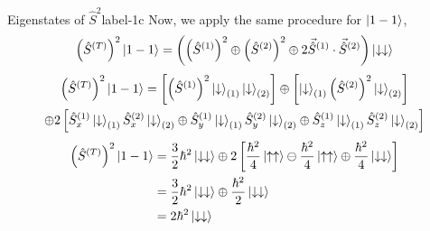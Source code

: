 \documentclass[../main.tex]{subfiles}
\begin{document}
\begin{sol}{Eigenstates of $\hat{S}^{2}$}{label-1c}
    Now, we apply the same procedure for $\ket{1-1}$,
\begin{align*}
        \qty(\hat{S}^{(T)})^2\ket{1-1} &= \qty(\qty(\hat{S}^{(1)})^2 \oplus \qty(\hat{S}^{(2)})^2 \oplus 2 \vec{\hat{S}}^{(1)}\cdot\vec{\hat{S}}^{(2)})\ket{\downarrow\downarrow} \\
    \end{align*}
    \begin{multline*}
        \qty(\hat{S}^{(T)})^2\ket{1-1} = \left[
                                        \qty(\hat{S}^{(1)})^{2}\ket{\downarrow}_{(1)}\ket{\downarrow}_{(2)}
                                     \right]
                                     \oplus
                                     \left[
                                        \ket{\downarrow}_{(1)}\qty(\hat{S}^{(2)})^{2}\ket{\downarrow}_{(2)}
                                     \right]
                                     \\
                                    \oplus
                                    2\left[
                                        \hat{S}_{x}^{(1)}\ket{\downarrow}_{(1)}\hat{S}_{x}^{(2)}\ket{\downarrow}_{(2)} 
                                        \oplus
                                        \hat{S}_{y}^{(1)}\ket{\downarrow}_{(1)}\hat{S}_{y}^{(2)}\ket{\downarrow}_{(2)}
                                        \oplus
                                        \hat{S}_{z}^{(1)}\ket{\downarrow}_{(1)}\hat{S}_{z}^{(2)}\ket{\downarrow}_{(2)}
                                    \right]
    \end{multline*}
    \begin{align*}
        \qty(\hat{S}^{(T)})^2\ket{1-1} &= \frac{3}{2}\hbar^2\ket{\downarrow\downarrow} \oplus 2\left[\frac{\hbar^2}{4}\ket{\uparrow\uparrow}\ominus\frac{\hbar^2}{4}\ket{\uparrow\uparrow}\oplus\frac{\hbar^2}{4}\ket{\downarrow\downarrow}\right] \\
                                  &= \frac{3}{2}\hbar^2\ket{\downarrow\downarrow} \oplus \frac{\hbar^2}{2}\ket{\downarrow\downarrow} \\
                                  &= 2\hbar^2\ket{\downarrow\downarrow}
    \end{align*}


\end{sol}


\begin{comment}
\begin{align*}
    \ket{11} &= \uparrow\uparrow \\
    \ket{10} &= \frac{1}{\sqrt{2}}\qty(\uparrow\downarrow+\downarrow\uparrow),\quad s=1\mathrm{triplet} \\
    \ket{1-1} &= \downarrow\downarrow \\
\end{align*}

\begin{align*}
    \ket{00} &= \frac{1}{\sqrt{2}}\qty(\uparrow\downarrow-\downarrow\uparrow) \quad s=0\mathrm{singlet}
\end{align*}
\end{comment}
\end{document}
